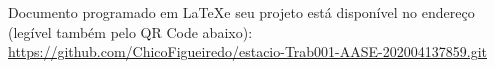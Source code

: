 
%
\begin{anexosenv}

\partanexos

Documento programado em \LaTeX  e seu projeto está disponível no endereço (legível também pelo QR Code abaixo): \\ \url{https://github.com/ChicoFigueiredo/estacio-Trab001-AASE-202004137859.git} \\


\end{anexosenv}
